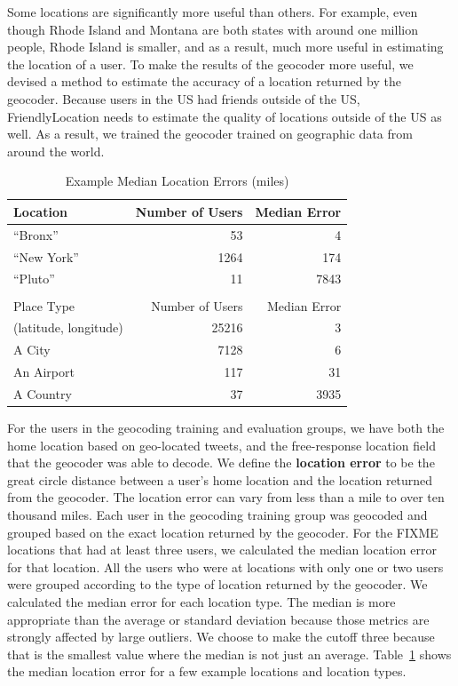 Some locations are significantly more useful than others.
For example, even though Rhode Island and Montana are both states with around
one million people, Rhode Island is smaller, and as a result, much more useful
in estimating the location of a user.
To make the results of the geocoder more useful, we devised a method to
estimate the accuracy of a location returned by the geocoder.
Because users in the US had friends outside of the US, FriendlyLocation needs
to estimate the quality of
locations outside of the US as well.
As a result, we trained the geocoder trained on geographic data from around the
world.

\begin{table}[t]
\centering
\caption{Example Median Location Errors (miles)}
\begin{tabular}{l r r} 
Location&Number of Users&Median Error\\ \hline
``Bronx''&53&4\\
``New York''&1264&174\\
``Pluto''&11&7843\\ \hline
\\
Place Type&Number of Users&Median Error\\ \hline
(latitude, longitude)&25216&3\\
A City&7128&6\\
An Airport&117&31\\
A Country&37&3935\\
\hline\end{tabular}
\label{tab:MedianLocErr}
\end{table}

For the users in the geocoding training and evaluation groups, we have both the
home location based on geo-located tweets, and the free-response location field
that the geocoder was able to decode.
We define the \textbf{location error} to be the great circle distance between a
user's home location and the location returned from the geocoder.
The location error can vary from less than a mile to over ten thousand miles.
Each user in the geocoding training group was geocoded and grouped based on the
exact location returned by the geocoder.
For the FIXME locations that had at least three users, we calculated the median
location error for that location.
All the users who were at locations with only one or two users were grouped
according to the type of location returned by the geocoder.
We calculated the median error for each location type.
The median is more appropriate than the average or standard deviation because
those metrics are strongly affected by large outliers.
We choose to make the cutoff three because that is the smallest value where the
median is not just an average.
Table~\ref{tab:MedianLocErr} shows the median location error for a few example
locations and location types.

